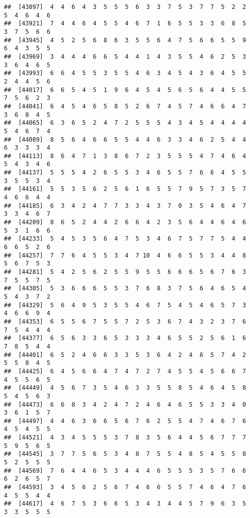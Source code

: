 \documentclass[
]{book}
\begin{document}
\begin{verbatim}
##  [43897]  4  4  6  4  3  5  5  5  6  3  3  7  5  3  7  7  5  2  2  5  4  6  4  6
##  [43921]  7  4  4  6  4  5  5  4  6  7  1  6  5  5  3  3  6  8  5  3  7  5  6  6
##  [43945]  4  5  2  5  6  8  6  3  5  5  6  4  7  5  6  6  5  5  9  6  4  3  5  5
##  [43969]  3  4  4  4  6  6  5  4  4  1  4  3  5  5  4  6  2  5  3  3  6  4  6  5
##  [43993]  6  6  4  5  5  3  5  5  4  6  3  4  5  4  3  6  4  5  5  2  4  4  5  6
##  [44017]  6  6  5  4  5  1  9  6  4  5  4  5  6  5  6  4  4  5  5  7  5  6  2  3
##  [44041]  6  4  5  4  6  5  8  5  2  6  7  4  5  7  4  6  6  4  7  3  6  8  4  5
##  [44065]  6  3  6  5  2  4  7  2  5  5  5  4  3  4  5  4  4  4  4  5  4  6  7  4
##  [44089]  8  5  6  4  6  6  5  5  4  4  6  3  3  4  6  2  5  4  4  6  3  3  3  4
##  [44113]  8  6  4  7  1  3  8  6  7  2  3  5  5  5  4  7  4  6  4  5  4  3  4  6
##  [44137]  5  5  5  4  2  6  5  5  3  4  6  5  5  7  6  6  4  5  5  3  5  5  3  4
##  [44161]  5  5  3  5  6  2  5  6  1  6  5  5  7  9  5  7  3  5  7  4  6  6  4  4
##  [44185]  6  3  4  2  4  7  7  3  3  4  3  7  0  3  5  4  6  4  7  3  3  4  6  7
##  [44209]  8  6  5  2  4  4  2  6  6  4  2  3  5  6  4  4  6  4  6  5  3  1  6  6
##  [44233]  5  4  5  3  5  6  4  7  5  3  4  6  7  5  7  7  5  4  4  6  6  5  2  6
##  [44257]  7  7  6  4  5  5  3  4  7 10  4  6  6  5  5  3  4  4  8  5  6  7  5  3
##  [44281]  5  4  2  5  6  2  5  5  9  5  5  6  6  6  5  6  7  6  3  7  5  5  7  5
##  [44305]  5  3  6  6  6  5  5  3  7  6  8  3  7  5  6  4  6  5  4  5  4  3  7  2
##  [44329]  5  6  4  9  5  3  5  5  4  6  7  5  4  5  4  6  5  7  3  4  6  6  9  4
##  [44353]  6  5  5  6  7  5  5  7  2  5  3  6  7  4  3  2  3  7  6  7  5  4  4  4
##  [44377]  6  5  6  3  3  6  5  3  3  3  4  6  5  5  2  5  6  1  6  7  8  5  4  4
##  [44401]  6  5  2  4  6  6  3  3  5  3  6  4  2  4  6  5  7  4  2  5  5  8  4  5
##  [44425]  6  4  5  6  6  4  7  4  7  2  7  4  5  5  4  5  6  6  7  4  5  5  6  5
##  [44449]  4  5  6  7  3  5  4  6  3  3  5  5  8  5  4  6  4  5  8  5  4  5  6  3
##  [44473]  6  6  8  3  4  2  4  7  2  4  6  4  6  5  5  3  3  4  0  3  6  1  5  7
##  [44497]  4  4  6  3  6  6  5  6  7  6  2  5  5  4  7  4  6  7  6  4  5  4  5  5
##  [44521]  4  3  4  5  5  5  3  7  8  3  5  6  4  4  5  6  7  7  7  5  9  5  6  5
##  [44545]  3  7  7  5  6  5  3  4  8  7  5  5  4  8  5  4  5  5  8  5  2  5  5  5
##  [44569]  7  6  4  4  6  5  3  4  4  4  6  5  5  5  3  5  7  6  6  6  2  6  5  7
##  [44593]  3  4  5  6  2  5  6  7  4  6  6  5  5  7  4  6  4  7  6  4  5  5  4  4
##  [44617]  4  6  7  5  3  6  6  5  3  4  3  4  4  5  7  9  6  3  5  3  3  5  5  5

\end{verbatim}
\end{document}
